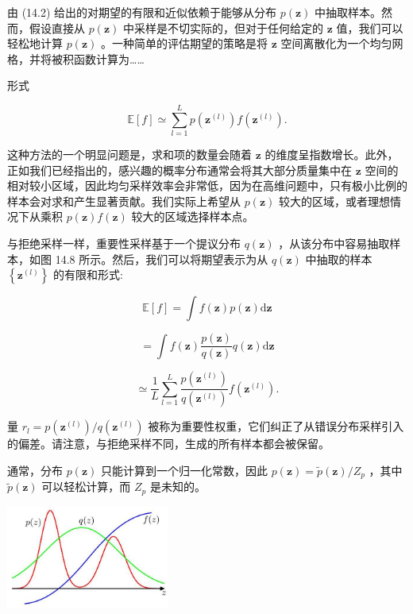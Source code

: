 \documentclass[10pt]{article}
\begin{document}
由 (14.2) 给出的对期望的有限和近似依赖于能够从分布 \(p\left( \mathbf{z}\right)\) 中抽取样本。然而，假设直接从 \(p\left( \mathbf{z}\right)\) 中采样是不切实际的，但对于任何给定的 \(\mathbf{z}\) 值，我们可以轻松地计算 \(p\left( \mathbf{z}\right)\) 。一种简单的评估期望的策略是将 \(\mathbf{z}\) 空间离散化为一个均匀网格，并将被积函数计算为……

形式

\[
\mathbb{E}\left\lbrack  f\right\rbrack   \simeq  \mathop{\sum }\limits_{{l = 1}}^{L}p\left( {\mathbf{z}}^{\left( l\right) }\right) f\left( {\mathbf{z}}^{\left( l\right) }\right) . \tag{14.18}
\]

这种方法的一个明显问题是，求和项的数量会随着 \(\mathbf{z}\) 的维度呈指数增长。此外，正如我们已经指出的，感兴趣的概率分布通常会将其大部分质量集中在 \(\mathbf{z}\) 空间的相对较小区域，因此均匀采样效率会非常低，因为在高维问题中，只有极小比例的样本会对求和产生显著贡献。我们实际上希望从 \(p\left( \mathbf{z}\right)\) 较大的区域，或者理想情况下从乘积 \(p\left( \mathbf{z}\right) f\left( \mathbf{z}\right)\) 较大的区域选择样本点。

与拒绝采样一样，重要性采样基于一个提议分布 \(q\left( \mathbf{z}\right)\) ，从该分布中容易抽取样本，如图 14.8 所示。然后，我们可以将期望表示为从 \(q\left( \mathbf{z}\right)\) 中抽取的样本 \(\left\{  {\mathbf{z}}^{\left( l\right) }\right\}\) 的有限和形式:

\[
\mathbb{E}\left\lbrack  f\right\rbrack   = \int f\left( \mathbf{z}\right) p\left( \mathbf{z}\right) \mathrm{d}\mathbf{z}
\]

\[
= \int f\left( \mathbf{z}\right) \frac{p\left( \mathbf{z}\right) }{q\left( \mathbf{z}\right) }q\left( \mathbf{z}\right) \mathrm{d}\mathbf{z}
\]

\[
\simeq  \frac{1}{L}\mathop{\sum }\limits_{{l = 1}}^{L}\frac{p\left( {\mathbf{z}}^{\left( l\right) }\right) }{q\left( {\mathbf{z}}^{\left( l\right) }\right) }f\left( {\mathbf{z}}^{\left( l\right) }\right) . \tag{14.19}
\]

量 \({r}_{l} = p\left( {\mathbf{z}}^{\left( l\right) }\right) /q\left( {\mathbf{z}}^{\left( l\right) }\right)\) 被称为重要性权重，它们纠正了从错误分布采样引入的偏差。请注意，与拒绝采样不同，生成的所有样本都会被保留。

通常，分布 \(p\left( \mathbf{z}\right)\) 只能计算到一个归一化常数，因此 \(p\left( \mathbf{z}\right)  = \widetilde{p}\left( \mathbf{z}\right) /{Z}_{p}\) ，其中 \(\widetilde{p}\left( \mathbf{z}\right)\) 可以轻松计算，而 \({Z}_{p}\) 是未知的。

\begin{center}
\includegraphics[max width=0.4\textwidth]{images/0194e279-9b28-703a-88f4-c3ac21e2010d_457_1006_346_545_343_0.jpg}
\end{center}
\hspace*{3em} 
\end{document}
